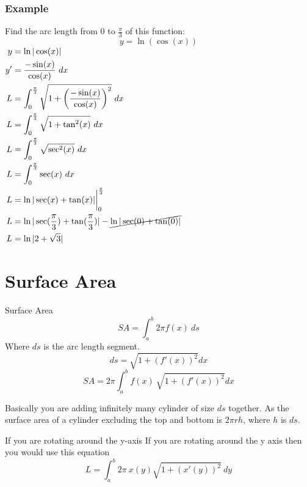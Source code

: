 \documentclass[letterpaper,10pt,twoside,twocolumn,openany]{book}
\begin{document}
\subsubsection{Example}
Find the arc length from 0 to $\frac{\pi}{3}$ of this function:\\
$$
    y = \ln(\cos(x))
$$
\newpage
$\begin{aligned}
    y &= \ln|\cos(x)|\\
    y' &= \frac{-\sin(x)}{\cos(x)}\ dx\\ 
    L &= \int_0^{\frac{\pi}{3}} \sqrt{1 + \biggl( \frac{-\sin(x)}{\cos(x)}\biggl)^2} \ dx\\ 
    L &= \int_0^{\frac{\pi}{3}} \sqrt{1 + \tan^2(x)} \ dx\\
    L &= \int_0^{\frac{\pi}{3}} \sqrt{\sec^2(x)} \ dx\\ 
    L &= \int_0^{\frac{\pi}{3}} \sec(x)\ dx\\
    L &= \ln|\sec(x) + \tan(x)|\biggl|_0^{\frac{\pi}{3}}\\ 
    L &= \ln|\sec(\frac{\pi}{3}) + \tan(\frac{\pi}{3})| - \cancel{\ln|\sec(0) + \tan(0)|}\\ 
    L &= \ln|2 + \sqrt{3}|
\end{aligned}$


\section{Surface Area}
\begin{paperbox}{Surface Area}
    \begin{equation}
        SA = \int_a^b 2\pi f(x)\ ds
    \end{equation}
    Where $ds$ is the arc length segment.
    \begin{equation*}
        ds = \sqrt{1 + (f'(x))^2}dx
    \end{equation*}
    \begin{equation}
        SA = 2\pi \int_a^b f(x)\ \sqrt{1 + (f'(x))^2}dx
    \end{equation}
\end{paperbox}
Basically you are adding infinitely many cylinder of size $ds$ together. As the surface area of a cylinder excluding the top and bottom is $2\pi r h $, where $h$ is $ds$.\\
\begin{commentbox}{If you are rotating around the y-axis}   
    If you are rotating around the y axis then you would use this equation
    \begin{equation} 
        L = \int_a^b 2\pi\ x(y) \sqrt{1 + (x'(y))^2}\ dy
    \end{equation}
\end{commentbox}
\newpage
\end{document}
